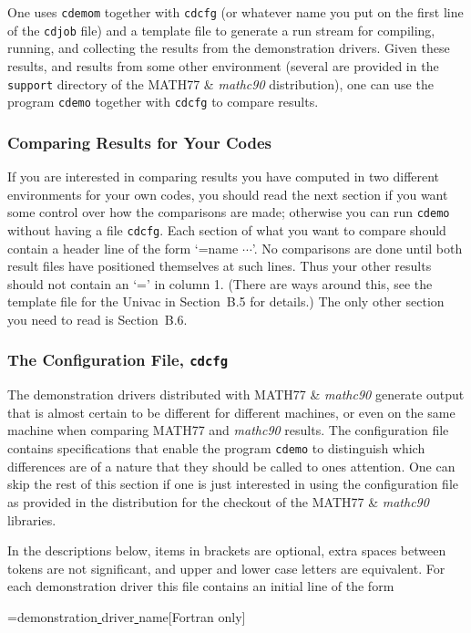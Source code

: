 \documentclass[twoside]{MATH77}
\begin{document}
One uses {\tt cdemom} together with {\tt cdcfg} (or whatever name you put on
the first line of the {\tt cdjob} file) and a template file to
generate a run stream for compiling, running, and collecting the results
from the demonstration drivers.  Given these results, and results
from some other environment (several are provided in the {\tt support}
directory of the MATH77 \& {\em mathc90} distribution), one can use the
program {\tt cdemo} together with {\tt cdcfg} to compare results.

\subsubsection{Comparing Results for Your Codes}
If you are interested in comparing results you have computed in two
different environments for your own codes, you should read the next
section if you want some control over how the comparisons are made;
otherwise you can run {\tt cdemo} without having a file {\tt cdcfg}.  Each
section of what you want to compare should contain a header line of the
form `=name $\cdots$'.  No comparisons are done until both result files
have positioned themselves at such lines.  Thus your other results should
not contain an `=' in column 1.  (There are ways around this, see the
template file for the Univac in Section~B.5 for details.) The only other
section you need to read is Section~B.6.

\subsubsection{The Configuration File, {\tt cdcfg}}
The demonstration drivers distributed with MATH77 \& {\em mathc90}
generate output that is almost certain to be different for different
machines, or even on the same machine when comparing MATH77 and {\em
mathc90} results.  The configuration file contains specifications that
enable the program {\tt cdemo} to distinguish which differences are of a
nature that they should be called to ones attention.  One can skip the
rest of this section if one is just interested in using the configuration
file as provided in the distribution for the checkout of the MATH77 \&
{\em mathc90} libraries.

In the descriptions below, items in brackets are optional, extra spaces
between tokens are not significant, and upper and lower case letters are
equivalent.  For each demonstration driver this file contains an initial
line of the form

=demonstration\underline{ }driver\underline{ }name\hspace{.5in}[Fortran
only]
\end{document}
